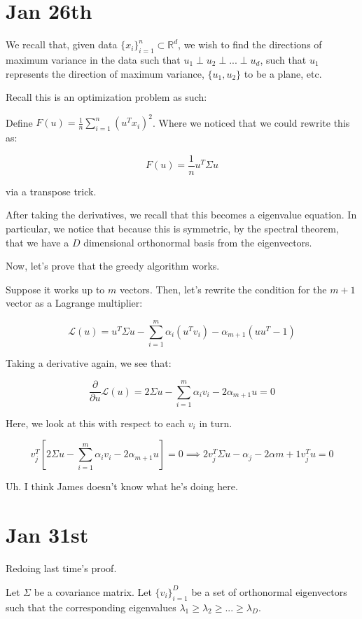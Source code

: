 \documentclass[10pt]{article}
\begin{document}
\section*{Jan 26th}

We recall that, given data $\{ x_i \}_{i=1}^n \subset \mathbb{R}^d$, we wish to find the directions of maximum variance in the data such that $u_1 \perp u_2 \perp ... \perp u_d$, such that $u_1$ represents the direction of maximum variance, $\{ u_1, u_2 \}$ to be a plane, etc.

Recall this is an optimization problem as such:

Define $F(u) = \frac{1}{n} \sum_{i=1}^n (u^T x_i)^2$. Where we noticed that we could rewrite this as:

$$ F(u) =   \frac{1}{n} u^T \Sigma u$$

via a transpose trick. 

After taking the derivatives, we recall that this becomes a eigenvalue equation. In particular, we notice that because this is symmetric, by the spectral theorem, that we have a $D$ dimensional orthonormal basis from the eigenvectors. 

Now, let’s prove that the greedy algorithm works.

Suppose it works up to $m$ vectors. Then, let’s rewrite the condition for the $m+1$ vector as a Lagrange multiplier:

$$ \mathcal{L}(u) = u^T \Sigma u - \sum_{i=1}^m \alpha_i (u^T v_i)  - \alpha_{m+1} ( u u^T - 1) $$

Taking a derivative again, we see that:

$$ \frac{\partial}{\partial u} \mathcal{L}(u) = 2\Sigma u - \sum_{i=1}^m \alpha_i v_i  - 2\alpha_{m+1} u = 0$$

Here, we look at this with respect to each $v_i$ in turn.

$$ v_j^T \left[ 2\Sigma u - \sum_{i=1}^m \alpha_i v_i  - 2\alpha_{m+1} u \right]  = 0 \implies 2 v_j^T \Sigma u - \alpha_j - 2\alpha{m+1} v_j^Tu = 0$$

Uh. I think James doesn’t know what he’s doing here.

\section*{Jan 31st}

Redoing last time’s proof.

Let $\Sigma$ be a covariance matrix. Let $\{ v_i \}_{i=1}^D$ be a set of orthonormal eigenvectors such that the corresponding eigenvalues $\lambda_1 \geq \lambda_2 \geq ... \geq \lambda_D$.
\end{document}
